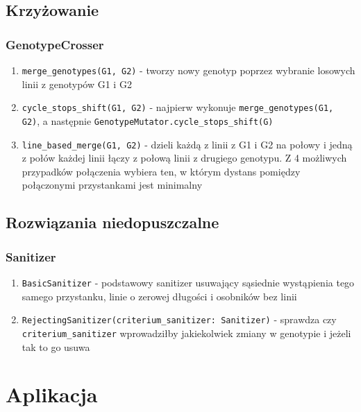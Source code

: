 \documentclass[12pt,a4paper]{article}
\begin{document}
\subsection{Krzyżowanie}

\subsubsection{GenotypeCrosser}

\begin{enumerate}
    \item \lstinline{merge_genotypes(G1, G2)} - tworzy nowy genotyp poprzez wybranie losowych linii z genotypów G1 i G2
    \item \lstinline{cycle_stops_shift(G1, G2)} - najpierw wykonuje \lstinline{merge_genotypes(G1, G2)}, a następnie \lstinline{GenotypeMutator.cycle_stops_shift(G)}
    \item \lstinline{line_based_merge(G1, G2)} - dzieli każdą z linii z G1 i G2 na połowy i jedną z połów każdej linii łączy z połową linii z drugiego genotypu. Z 4 możliwych przypadków połączenia wybiera ten, w którym dystans pomiędzy połączonymi przystankami jest minimalny
\end{enumerate}

\subsection{Rozwiązania niedopuszczalne}

\subsubsection{Sanitizer}

\begin{enumerate}
    \item \lstinline{BasicSanitizer} - podstawowy sanitizer usuwający sąsiednie wystąpienia tego samego przystanku, linie o zerowej długości i osobników bez linii
    \item \lstinline{RejectingSanitizer(criterium_sanitizer: Sanitizer)} - sprawdza czy \lstinline{criterium_sanitizer} wprowadziłby jakiekolwiek zmiany w genotypie i jeżeli tak to go usuwa
\end{enumerate}

\section{Aplikacja}
\end{document}
